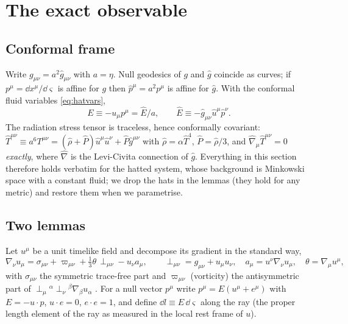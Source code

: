 \section{The exact observable}
\label{sec:observable}

\subsection{Conformal frame}
\label{sec:conformal}
Write $g_{\mu\nu}=a^2\hat g_{\mu\nu}$ with $a=\eta$.  Null geodesics of $g$ and $\hat g$ coincide as
curves; if $p^\mu=\dd x^\mu/\dd\varsigma$ is affine for $g$ then $\hat p^\mu=a^2p^\mu$ is affine for $\hat g$.
With the conformal fluid variables \eqref{eq:hatvars},
\begin{equation}
E\equiv-u_\mu p^\mu=\hat E/a,\qquad \hat E\equiv-\hat g_{\mu\nu}\hat u^\mu\hat p^\nu .
\label{eq:Ehat}
\end{equation}
The radiation stress tensor is traceless, hence conformally covariant:
$\hat T^{\mu\nu}\equiv a^6T^{\mu\nu}=(\hat\rho+\hat P)\hat u^\mu\hat u^\nu+\hat P\hat g^{\mu\nu}$ with
$\hat\rho=\alpha\hat T^4$, $\hat P=\hat\rho/3$, and $\hat\nabla_\mu\hat T^{\mu\nu}=0$ \emph{exactly}, where
$\hat\nabla$ is the Levi-Civita connection of $\hat g$.  Everything in this section therefore holds verbatim
for the hatted system, whose background is Minkowski space with a constant fluid; we drop the hats
in the lemmas (they hold for any metric) and restore them when we parametrise.

\subsection{Two lemmas}
Let $u^\mu$ be a unit timelike field and decompose its gradient in the standard way,
\begin{equation}
\nabla_\nu u_\mu=\sigma_{\mu\nu}+\varpi_{\mu\nu}+\tfrac13\theta\,\perp_{\mu\nu}-u_\nu a_\mu,\qquad
\perp_{\mu\nu}=g_{\mu\nu}+u_\mu u_\nu,\quad a_\mu=u^\nu\nabla_\nu u_\mu,\quad \theta=\nabla_\mu u^\mu,
\label{eq:kinematic}
\end{equation}
with $\sigma_{\mu\nu}$ the symmetric trace-free part and $\varpi_{\mu\nu}$ (vorticity) the antisymmetric part of
$\perp_\mu{}^\alpha \perp_\nu{}^\beta\nabla_\beta u_\alpha$ \cite{Ellis71}.  For a null vector $p^\mu$ write
$p^\mu=E(u^\mu+e^\mu)$ with $E=-u\cdot p$, $u\cdot e=0$, $e\cdot e=1$, and define $\dd l\equiv E\,\dd\varsigma$ along the ray
(the proper length element of the ray as measured in the local rest frame of $u$).

